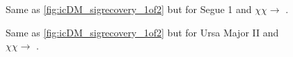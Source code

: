 \begin{figure}[t]
    \caption{Same as \cref{fig:icDM_sigrecovery_1of2} but for Segue 1 and  $\chi\chi \rightarrow$ \parpar{\nu_\mu}.}
    \label{fig:apdx_seg1numu_sigrecovery}
\end{figure}

\begin{figure}[t]
    \caption{Same as \cref{fig:icDM_sigrecovery_1of2} but for Ursa Major II and  $\chi\chi \rightarrow$ .}
    \label{fig:apdx_UMa2bb_sigrecovery}
\end{figure}

